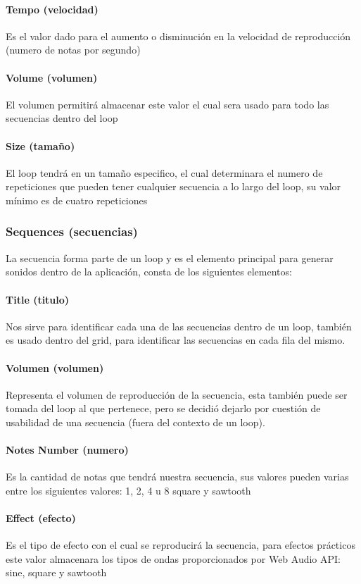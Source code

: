\paragraph{Tempo (velocidad)}
Es el valor dado para el aumento o disminución en la velocidad de reproducción
(numero de notas por segundo)
\paragraph{Volume (volumen)}
El volumen permitirá almacenar este valor el cual sera usado para todo las
secuencias dentro del loop
\paragraph{Size (tamaño)}
El loop tendrá en un tamaño especifico, el cual determinara el numero de repeticiones
que pueden tener cualquier secuencia a lo largo del loop, su valor mínimo
es de cuatro repeticiones

\subsubsection{Sequences (secuencias)}
La secuencia forma parte de un loop y es el elemento principal para generar sonidos
dentro de la aplicación, consta de los siguientes elementos:
\paragraph{Title (titulo)}
Nos sirve para identificar cada una de las secuencias dentro de un loop, también
es usado dentro del grid, para identificar las secuencias en cada fila del mismo.
\paragraph{Volumen (volumen)}
Representa el volumen de reproducción de la secuencia, esta también puede ser tomada
del loop al que pertenece, pero se decidió dejarlo por cuestión de usabilidad de
una secuencia (fuera del contexto de un loop).
\paragraph{Notes Number (numero)}
Es la cantidad de notas que tendrá nuestra secuencia, sus valores pueden varias entre los
siguientes valores: 1, 2, 4 u 8
square y sawtooth
\paragraph{Effect (efecto)}
Es el tipo de efecto con el cual se reproducirá la secuencia, para efectos prácticos
este valor almacenara los tipos de ondas proporcionados por Web Audio API: sine,
square y sawtooth

